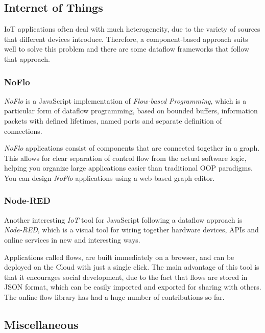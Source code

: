 \documentclass[sigplan,review,anonymous]{acmart}\settopmatter{printfolios=true}
\begin{document}
\subsection{Internet of Things}

IoT applications often deal with much heterogeneity, due to the variety of sources that different devices introduce. Therefore, a component-based approach suits well to solve this problem and there are some dataflow frameworks that follow that approach.

\subsubsection{NoFlo}

\textit{NoFlo} is a JavaScript implementation of \textit{Flow-based Programming}\cite{fbp}, which is a particular form of dataflow programming, based on bounded buffers, information packets with defined lifetimes, named ports and separate definition of connections.

\textit{NoFlo} applications consist of components that are connected together in a graph. This allows for clear separation of control flow from the actual software logic, helping you organize large applications easier than traditional OOP paradigms. You can design \textit{NoFlo} applications using a web-based graph editor.

\subsubsection{Node-RED}

Another interesting \textit{IoT} tool for JavaScript following a dataflow approach is \textit{Node-RED}\cite{node-red}, which is a visual tool for wiring together hardware devices, APIs and online services in new and interesting ways. 

Applications called flows, are built immediately on a browser, and can be deployed on the Cloud with just a single click. The main advantage of this tool is that it encourages social development, due to the fact that flows are stored in JSON format, which can be easily imported and exported for sharing with others. The online flow library has had a huge number of contributions so far.

\subsection{Miscellaneous}
\end{document}
